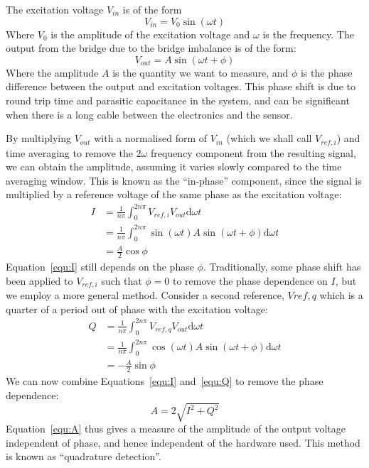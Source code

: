 \documentclass[12pt,a4paper]{article}
\begin{document}
The excitation voltage $V_{in}$ is of the form
\begin{equation}
  \label{equ:vin}
  V_{in} = V_0\sin(\omega t)
\end{equation}
Where $V_0$ is the amplitude of the excitation voltage and $\omega$ is the frequency. The output from the bridge due to the bridge imbalance is of the form:
\begin{equation}
  \label{equ:vout}
  V_{out} = A\sin(\omega t + \phi)
\end{equation}
Where the amplitude $A$ is the quantity we want to measure, and $\phi$ is the phase difference between the output and excitation voltages. This phase shift is due to round trip time and parasitic capacitance in the system, and can be significant when there is a long cable between the electronics and the sensor.

By multiplying $V_{out}$ with a normalised form of $V_{in}$ (which we shall call $V_{ref,i}$) and time averaging to remove the $2\omega$ frequency component from the resulting signal, we can obtain the amplitude, assuming it varies slowly compared to the time averaging window. This is known as the ``in-phase'' component, since the signal is multiplied by a reference voltage of the same phase as the excitation voltage:
\begin{equation}
  \label{equ:I}
  \begin{split}
  I &= \frac{1}{n\pi}\int_{0}^{2n\pi}V_{ref,i}V_{out}\mathrm{d}\omega t \\
  &= \frac{1}{n\pi}\int_{0}^{2n\pi}\sin(\omega t) A \sin(\omega t + \phi)\mathrm{d}\omega t \\
  &= \frac{A}{2}\cos \phi
  \end{split}
\end{equation}
Equation~\ref{equ:I} still depends on the phase $\phi$. Traditionally, some phase shift has been applied to $V_{ref,i}$ such that $\phi = 0$ to remove the phase dependence on $I$, but we employ a more general method. Consider a second reference, $V{ref,q}$ which is a quarter of a period out of phase with the excitation voltage:
\begin{equation}
  \label{equ:Q}
  \begin{split}
  Q &= \frac{1}{n\pi}\int_{0}^{2n\pi}V_{ref,q}V_{out}\mathrm{d}\omega t \\
  &= \frac{1}{n\pi}\int_{0}^{2n\pi}\cos(\omega t) A \sin(\omega t + \phi)\mathrm{d}\omega t \\
  &= -\frac{A}{2}\sin \phi
  \end{split}
\end{equation}
We can now combine Equations~\ref{equ:I} and~\ref{equ:Q} to remove the phase dependence:
\begin{equation}
  \label{equ:A}
  A = 2\sqrt{I^2 + Q^2}
\end{equation}
Equation~\ref{equ:A} thus gives a measure of the amplitude of the output voltage independent of phase, and hence independent of the hardware used. This method is known as ``quadrature detection''.
\end{document}
